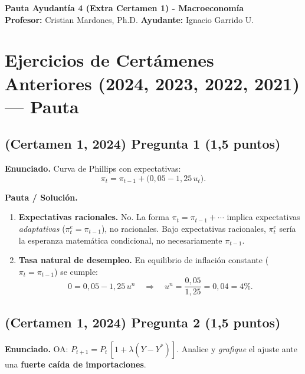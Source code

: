 \documentclass[11pt,addpoints]{article}
\begin{document}
\vspace*{0.01cm}

\begin{center}
{\Large \bfseries Pauta Ayudantía 4 (Extra Certamen 1) - Macroeconomía \\[0.6cm]}
\textbf{Profesor:} Cristian Mardones, Ph.D. \quad \textbf{Ayudante:} Ignacio Garrido U.
\end{center}

\section*{\textbf{Ejercicios de Certámenes Anteriores (2024, 2023, 2022, 2021) — Pauta}}

\subsection*{(Certamen 1, 2024) \quad Pregunta 1 (1,5 puntos)}
\textbf{Enunciado.} Curva de Phillips con expectativas:
\[
\pi_t = \pi_{t-1} + \big(0{,}05 - 1{,}25\,u_t\big).
\]

\textbf{Pauta / Solución.}

\begin{enumerate}[label=\alph*)]
\item \textbf{Expectativas racionales.} No. La forma \(\pi_t = \pi_{t-1} + \cdots\) implica expectativas \emph{adaptativas} (\(\pi_t^{e}=\pi_{t-1}\)), no racionales. Bajo expectativas racionales, \(\pi_t^{e}\) sería la esperanza matemática condicional, no necesariamente \(\pi_{t-1}\).

\item \textbf{Tasa natural de desempleo.} En equilibrio de inflación constante (\(\pi_t=\pi_{t-1}\)) se cumple:
\[
0 = 0{,}05 - 1{,}25\,u^n \quad \Rightarrow \quad u^n = \frac{0{,}05}{1{,}25} = 0{,}04 = \boxed{4\%}.
\]
\end{enumerate}


\subsection*{(Certamen 1, 2024) \quad Pregunta 2 (1,5 puntos)}
\textbf{Enunciado.} OA: \(P_{t+1}=P_t\,[1+\lambda(Y-Y^*)]\). Analice y \emph{grafique} el ajuste ante una \textbf{fuerte caída de importaciones}.
\end{document}
